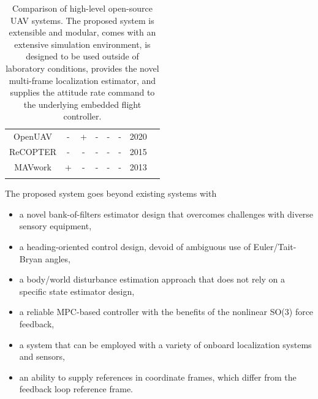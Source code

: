 \documentclass[a4paper,11pt,titlepage,twoside]{book}
\begin{document}
\begin{table}
\begin{tabular}{c|c|c|c|c|c|c|c}
    \small OpenUAV                        & \small -                            & \small +          & \small -          & \small -                                 & \small -                                & \small 2020                                  & \small \cite{schmittle2018openuav}        \\
    \small ReCOPTER                       & \small -                            & \small -          & \small -          & \small -                                 & \small -                                & \small 2015                                  & \small \cite{abeywardena2015design}       \\
    \small MAVwork                        & \small +                            & \small -          & \small -          & \small -                                 & \small -                                & \small 2013                                  & \small \cite{mellado2013mavwork}          \\
\noalign{\smallskip}\hline
  \end{tabular}
  \caption{Comparison of high-level open-source \ac{UAV} systems. The proposed system is extensible and modular, comes with an extensive simulation environment, is designed to be used outside of laboratory conditions, provides the novel multi-frame localization estimator, and supplies the attitude rate command to the underlying embedded flight controller.\label{tab:uav_systems}}
\end{table}


The proposed system goes beyond existing systems with
\begin{itemize}
  \item a novel bank-of-filters estimator design that overcomes challenges with diverse sensory equipment,
  \item a heading-oriented control design, devoid of ambiguous use of Euler/Tait-Bryan angles,
  \item a body/world disturbance estimation approach that does not rely on a specific state estimator design,
  \item a reliable MPC-based controller with the benefits of the nonlinear SO(3) force feedback,
  \item a system that can be employed with a variety of onboard localization systems and sensors,
  \item an ability to supply references in coordinate frames, which differ from the feedback loop reference frame.
\end{itemize}
\end{document}
